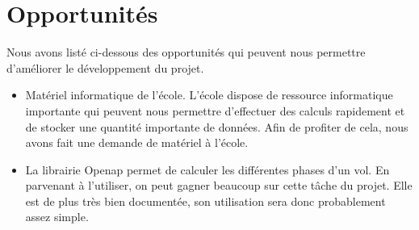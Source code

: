 \section*{Opportunités}

Nous avons listé ci-dessous des opportunités qui peuvent nous permettre d'améliorer le développement du projet.
\begin{itemize}
	\item Matériel informatique de l'école. L'école dispose de ressource informatique importante qui peuvent nous permettre d'effectuer des calculs rapidement et de stocker une quantité importante de données. Afin de profiter de cela, nous avons fait une demande de matériel à l'école.
	\item La librairie Openap permet de calculer les différentes phases d'un vol. En parvenant à l'utiliser, on peut gagner beaucoup sur cette tâche du projet. Elle est de plus très bien documentée, son utilisation sera donc probablement assez simple.
\end{itemize}

